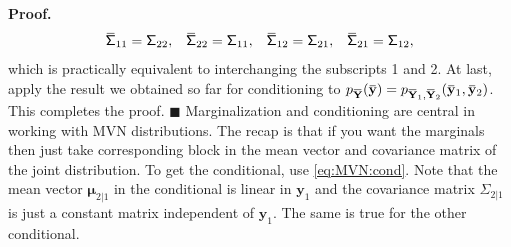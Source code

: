 \documentclass[10pt]{article}
\theoremstyle{definition}
\newenvironment{prf}{\noindent\textbf{Proof.}}{\hfill$\blacksquare$}
\newcommand{\overbar}[1]{\mkern 1.5mu\overline{\mkern-1.5mu#1\mkern-1.5mu}\mkern 1.5mu}
\begin{document}
\begin{prf}
\begin{equation*}
\begin{array}{cccc}
\overbar{\mathsf{\Sigma}}_{11} = \mathsf{\Sigma}_{22}, & \overbar{\mathsf{\Sigma}}_{22} = \mathsf{\Sigma}_{11}, &
\overbar{\mathsf{\Sigma}}_{12} = \mathsf{\Sigma}_{21}, &\overbar{\mathsf{\Sigma}}_{21} = \mathsf{\Sigma}_{12},
\end{array}
\end{equation*}
which is practically equivalent to interchanging the subscripts 1 and 2. At last, apply the result we obtained so far for conditioning to $p_{\overbar{\mathbf{Y}}}(\overbar{\mathbf{y}})=p_{\overbar{\mathbf{Y}}_1, \overbar{\mathbf{Y}}_2}(\overbar{\mathbf{y}}_1, \overbar{\mathbf{y}}_2)$. This completes the proof.
\end{prf}
\newline
\indent
Marginalization and conditioning are central in working with MVN distributions. The recap is that if you want the marginals then just take corresponding block in the mean vector and covariance matrix of the joint distribution. To get the conditional, use \cref{eq:MVN:cond}. Note that the mean vector $\boldsymbol{\mu}_{2|1}$ in the conditional is linear in $\mathbf{y}_1$ and the covariance matrix $\mathsf{\Sigma}_{2|1}$ is just a constant matrix independent of $\mathbf{y}_1$. The same is true for the other conditional.
\end{document}
